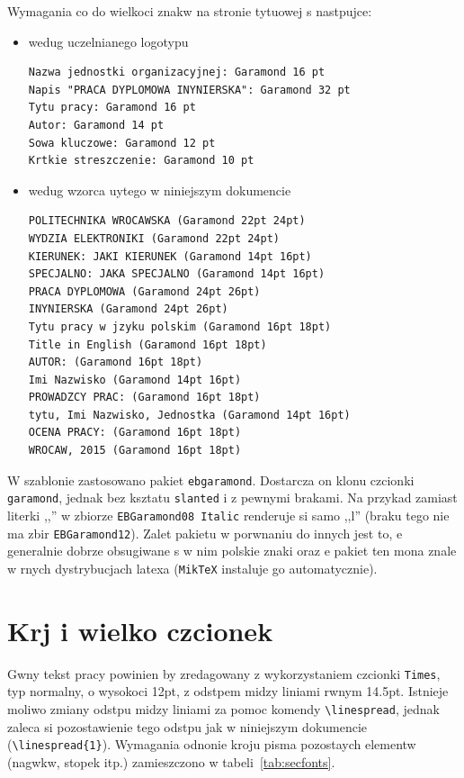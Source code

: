 Wymagania co do wielkoci znakw na stronie tytuowej s nastpujce:
\begin{itemize}
\item wedug uczelnianego logotypu
\begin{lstlisting}[basicstyle=\footnotesize\ttfamily]
Nazwa jednostki organizacyjnej: Garamond 16 pt 
Napis "PRACA DYPLOMOWA INYNIERSKA": Garamond 32 pt 
Tytu pracy: Garamond 16 pt 
Autor: Garamond 14 pt 
Sowa kluczowe: Garamond 12 pt 
Krtkie streszczenie: Garamond 10 pt 
\end{lstlisting}
\item wedug wzorca uytego w niniejszym dokumencie
\begin{lstlisting}[basicstyle=\footnotesize\ttfamily]
POLITECHNIKA WROCAWSKA (Garamond 22pt 24pt)
WYDZIA ELEKTRONIKI (Garamond 22pt 24pt)
KIERUNEK: JAKI KIERUNEK (Garamond 14pt 16pt)
SPECJALNO: JAKA SPECJALNO (Garamond 14pt 16pt)
PRACA DYPLOMOWA (Garamond 24pt 26pt)
INYNIERSKA (Garamond 24pt 26pt)
Tytu pracy w jzyku polskim (Garamond 16pt 18pt)
Title in English (Garamond 16pt 18pt)
AUTOR: (Garamond 16pt 18pt)
Imi Nazwisko (Garamond 14pt 16pt)
PROWADZCY PRAC: (Garamond 16pt 18pt)
tytu, Imi Nazwisko, Jednostka (Garamond 14pt 16pt)
OCENA PRACY: (Garamond 16pt 18pt)
WROCAW, 2015 (Garamond 16pt 18pt)
\end{lstlisting}
\end{itemize}

W szablonie zastosowano pakiet \texttt{ebgaramond}. Dostarcza on klonu czcionki \texttt{garamond}, jednak bez ksztatu \texttt{slanted} i z pewnymi brakami. Na przykad zamiast literki ,,'' w zbiorze \texttt{EBGaramond08 Italic} renderuje si samo ,,l'' (braku tego nie ma zbir \texttt{EBGaramond12}).  Zalet pakietu  w porwnaniu do innych jest to, e generalnie dobrze obsugiwane s w nim polskie znaki oraz e pakiet ten mona znale w rnych dystrybucjach latexa (\texttt{MikTeX} instaluje go automatycznie).

\section{Krj i wielko czcionek}
Gwny tekst pracy powinien by zredagowany z wykorzystaniem czcionki \texttt{Times}, typ normalny, o wysokoci 12pt, z odstpem midzy liniami rwnym 14.5pt. Istnieje moliwo zmiany odstpu midzy liniami za pomoc komendy \verb?\linespread?, jednak zaleca si pozostawienie tego odstpu jak w niniejszym dokumencie (\verb?\linespread{1}?). Wymagania odnonie kroju pisma pozostaych elementw (nagwkw, stopek itp.) zamieszczono w tabeli~\ref{tab:secfonts}.

